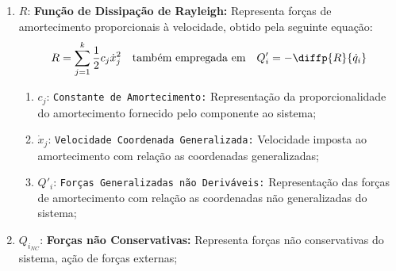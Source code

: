 \documentclass{article}
\begin{document}
\begin{enumerate}[rightmargin = \leftmargin]
                    \item $R$: \textbf{Função de Dissipação de Rayleigh:} Representa forças de amortecimento proporcionais à velocidade, obtido pela seguinte equação:
                        \begin{equation}
                            R = 
                            \sum_{j=1}^{k} 
                            \frac{1}{2} c_{j} \dot{x}_{j}^{2}
                            \quad\text{também empregada em}\quad
                            Q'_{i} = -\diffp{R}{{\dot{q}_{i}}}
                        \end{equation}
                        \begin{enumerate}[rightmargin = \leftmargin, noitemsep]
                            \item $c_{j}$: \texttt{Constante de Amortecimento:} Representação da proporcionalidade do amortecimento fornecido pelo componente ao sistema;
                            
                            \item $\dot{x}_{j}$: \texttt{Velocidade Coordenada Generalizada:} Velocidade imposta ao amortecimento com relação as coordenadas generalizadas;

                            \item $Q'_{i}$: \texttt{Forças Generalizadas não Deriváveis:} Representação das forças de amortecimento com relação as coordenadas não generalizadas do sistema;
                        \end{enumerate}

                    \item $Q_{i_{NC}}$: \textbf{Forças não Conservativas:} Representa forças não conservativas do sistema, ação de forças externas;
                \end{enumerate}
\end{document}
